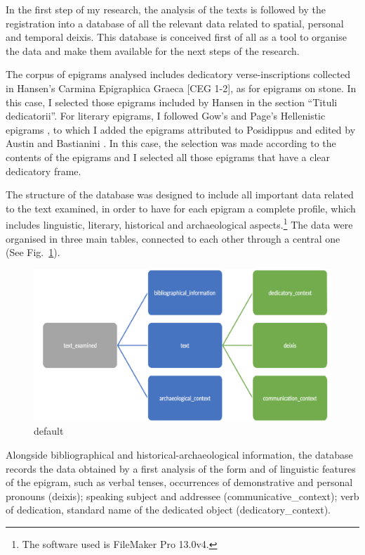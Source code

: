\documentclass[amsthm,ebook]{saparticle}
\begin{document}
\noindent In the first step of my research, the analysis of the texts is followed by the registration into a database of all the
relevant data related to spatial, personal and temporal deixis. This database is conceived first of all as a tool to
organise the data and make them available for the next steps of the research.

The corpus of epigrams analysed includes dedicatory verse-inscriptions collected in Hansen's Carmina Epigraphica Graeca
[CEG 1-2], as for epigrams on stone. In this case, I selected those epigrams included by Hansen in the section “Tituli
dedicatorii”. For literary epigrams, I followed Gow's and Page's Hellenistic epigrams \citep{gow_greek_1965}, to which I added
the epigrams attributed to Posidippus and edited by Austin and Bastianini \citep{austin_posidippi_2002}. In this case, the
selection was made according to the contents of the epigrams and I selected all those epigrams that have a clear
dedicatory frame.

The structure of the database was designed to include all important data related to the text examined, in order to have
for each epigram a complete profile, which includes linguistic, literary, historical and archaeological
aspects.\footnote{ The software used is FileMaker Pro 13.0v4.} The data were organised in three main tables, connected
to each other through a central one (See Fig.~\ref{fig:1}). 

\begin{figure}[!bp]
\centering
 \includegraphics[width=\columnwidth]{schema.png}
\caption{default}
\label{fig:1}
\end{figure}


Alongside bibliographical and historical-archaeological information, the database records the data obtained by a first
analysis of the form and of linguistic features of the epigram, such as verbal tenses, occurrences of demonstrative and
personal pronouns (deixis); speaking subject and addressee (communicative\_context); verb of dedication, standard name
of the dedicated object (dedicatory\_context).
\end{document}
